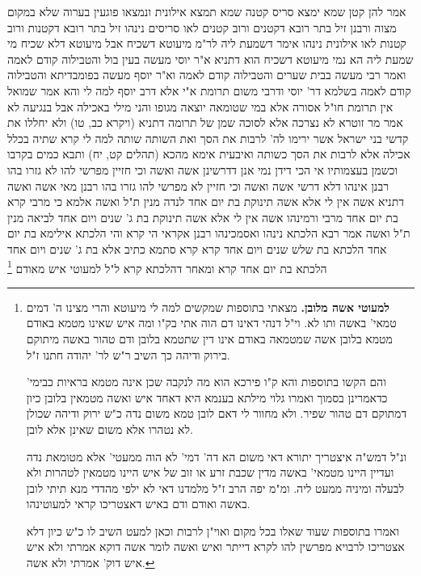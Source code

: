 \documentclass[12pt, openany]{book}
\newcommand{\footnotecomment}[1]{\footnote{#1}}
\newcommand{\commenta}[1]{\footnotecomment{#1}}
\begin{document}
{אמר להן  קטן שמא ימצא סריס קטנה שמא תמצא אילונית ונמצאו פוגעין בערוה שלא במקום מצוה 
ורבנן  זיל בתר רובא דקטנים ורוב קטנים לאו סריסים נינהו זיל בתר רובא דקטנות ורוב קטנות לאו אילונית נינהו 
אימר דשמעת ליה לר"מ מיעוטא דשכיח אבל מיעוטא דלא שכיח מי שמעת ליה 
הא נמי מיעוטא דשכיח הוא  דתניא א"ר יוסי  מעשה בעין בול והטבילוה קודם לאמה  ואמר רבי  מעשה בבית שערים והטבילוה קודם לאמה  וא"ר יוסף  מעשה בפומבדיתא והטבילוה קודם לאמה 
בשלמא דר' יוסי ודרבי משום תרומת א"י אלא דרב יוסף למה לי  והא אמר שמואל  אין תרומת חו"ל אסורה אלא במי שטומאה יוצאה מגופו והני מילי באכילה אבל בנגיעה לא 
אמר מר זוטרא  לא נצרכה אלא לסוכה שמן של תרומה  דתניא  (ויקרא כב, טו) ולא יחללו את קדשי בני ישראל אשר ירימו לה' לרבות את הסך ואת השותה
שותה למה לי  קרא שתיה בכלל אכילה  אלא לרבות את הסך כשותה  ואיבעית אימא מהכא  (תהלים קט, יח) ותבא כמים בקרבו וכשמן בעצמותיו 
אי הכי דידן נמי 
אנן דדרשינן אשה ואשה וכי חזיין מפרשי להו לא גזרו בהו רבנן  אינהו דלא דרשי אשה ואשה וכי חזיין לא מפרשי להו גזרו בהו רבנן 
מאי אשה ואשה  דתניא  אשה אין לי אלא אשה תינוקת בת יום אחד לנדה מנין  ת"ל  ואשה 
אלמא כי מרבי קרא בת יום אחד מרבי ורמינהו  אשה אין לי אלא אשה תינוקת בת ג' שנים ויום אחד לביאה מנין  ת"ל  ואשה 
אמר רבא  הלכתא נינהו ואסמכינהו רבנן אקראי  הי קרא והי הלכתא  אילימא בת יום אחד הלכתא בת שלש שנים ויום אחד קרא קרא סתמא כתיב 
אלא בת ג' שנים ויום אחד הלכתא בת יום אחד קרא  ומאחר דהלכתא קרא ל"ל
למעוטי איש מאודם 
\commenta{\textbf{למעוטי אשה מלובן.}  מצאתי בתוספות שמקשים למה לי מיעוטא והרי מצינו ה' דמים טמאי' באשה ותו לא. וי"ל דנהי דאינו דם הוה אתי בק"ו ומה איש שאינו מטמא באודם מטמא בלובן אשה שמטמאה באודם אינו דין שתטמא בלובן ודם טהור באשה מיתוקם בירוק ודיהה כך השיב ר"ש לר' יהודה חתנו ז"ל.\par והם הקשו בתוספות והא ק"ו פירכא הוא מה לנקבה שכן אינה מטמא בראיות כבימי' כדאמרינן בסמוך ואמרו גלוי מילתא בענמא היא דאחד איש ואשה מטמאין בלובן כיון דמתוקם דם טהור שפיר. ולא מחוור לי דאם לובן טמא משום נדה כ"ש ירוק ודיהה שכולן לא נטהרו אלא משום שאינן אלא לובן.\par  ונ"ל דמש"ה איצטריך יתורא דאי משום הא דה' דמי' לא הוה ממעטי' אלא מטומאת נדה ועדיין היינו מטמאי' באשה מדין שכבת זרע או זוב של איש היינו מטמאין לטהרות ולא לבעלה ומיניה ממעט ליה. ומ"מ יפה הרב ז"ל מלמדנו דאי לא ילפי מהדדי מנא תיתי לובן באשה ואודם ודם באיש דאצטריכו קראי למעוטינהו.\par  ואמרו בתוספות שעוד שאלו בכל מקום ואוי"ן לרבות וכאן למעט השיב לו כ"ש כיון דלא אצטריכו לרבויא מפרשין להו לקרא דייתר ואיש ואשה לומר אשה דוקא אמרתי ולא איש איש דוק' אמרתי ולא אשה. }

}
\end{document}
